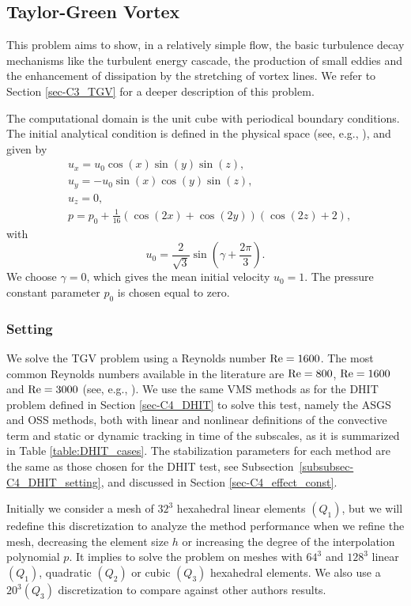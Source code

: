 \subsection{Taylor-Green Vortex}
\label{subsec-C4_TGV}
This problem aims to show, in a relatively simple flow, the basic turbulence decay mechanisms like the turbulent energy cascade, the production of small eddies and the enhancement of dissipation by the stretching of vortex lines. We refer to Section \ref{sec-C3_TGV} for a deeper description of this problem.

The computational domain is the unit cube with periodical boundary conditions. The initial analytical condition is defined in the physical space (see, e.g., \cite{gassner_accuracy_????}), and given by
\begin{align}
\label{eq-C4_ini_sol_TG}
&u_x=u_0\cos(x)\sin(y)\sin(z),\\\nonumber
&u_y=-u_0\sin(x)\cos(y)\sin(z),\\\nonumber
&u_z=0,\\\nonumber
&p=p_0+\frac{1}{16}\left(\cos(2x)+\cos(2y)\right)\left(\cos(2z)+2\right),
\end{align}
with
$$u_0=\frac{2}{\sqrt{3}}\sin\left(\gamma+\frac{2\pi}{3}\right).$$
We choose $\gamma=0$, which gives the mean initial velocity  $u_0=1$. The pressure constant parameter $p_0$ is chosen equal to zero.

\subsubsection{Setting}

We solve the TGV problem using a Reynolds number ${\rm Re}=1600$. 
The most common Reynolds numbers available in the literature are ${\rm Re}=800$, ${\rm Re}=1600$ and ${\rm Re}=3000$ (see, e.g., \cite{andrea_d._beck_numerical_2012, fauconnier_construction_2009, gassner_accuracy_????, jb_chapelier_final_2012}).
We use the same VMS methods as for the DHIT problem defined in Section \ref{sec-C4_DHIT} to solve this test, namely the ASGS and OSS methods, both with linear and nonlinear definitions of the convective term and static or dynamic tracking in time of the subscales, as it is summarized in Table \ref{table:DHIT_cases}.
The stabilization parameters for each method are the same as those chosen for the DHIT test, see Subsection~\ref{subsubsec-C4_DHIT_setting}, and discussed in Section \ref{sec-C4_effect_const}.

Initially we consider a mesh of $32^3$ hexahedral linear elements $(Q_1)$, but we will redefine this discretization to analyze the method performance when we refine the mesh, decreasing the element size $h$ or increasing the degree of the interpolation polynomial $p$. It implies to solve the problem on meshes with $64^3$ and $128^3$ linear $(Q_1)$, quadratic $(Q_2)$ or cubic $(Q_3)$ hexahedral elements. We also use a $20^3(Q_3)$ discretization to compare against other authors results.

